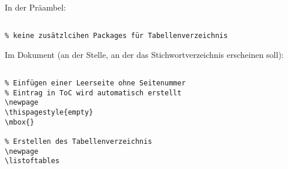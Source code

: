 
In der Präambel:

\begin{verbatim}

% keine zusätzlcihen Packages für Tabellenverzeichnis

\end{verbatim}

\tcblower

Im Dokument (an der Stelle, an der das Stichwortverzeichnis erscheinen soll): 

\begin{verbatim}

% Einfügen einer Leerseite ohne Seitenummer
% Eintrag in ToC wird automatisch erstellt
\newpage
\thispagestyle{empty}
\mbox{}

% Erstellen des Tabellenverzeichnis 
\newpage
\listoftables

\end{verbatim}
